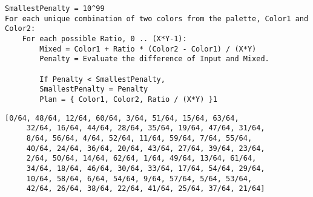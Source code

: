 \begin{lstlisting}[style=pseudocode,caption={План нахождения цвета пикселя}]
SmallestPenalty = 10^99 
For each unique combination of two colors from the palette, Color1 and Color2:
    For each possible Ratio, 0 .. (X*Y-1):
        Mixed = Color1 + Ratio * (Color2 - Color1) / (X*Y)
        Penalty = Evaluate the difference of Input and Mixed.

        If Penalty < SmallestPenalty,
        SmallestPenalty = Penalty
        Plan = { Color1, Color2, Ratio / (X*Y) }1
\end{lstlisting}
\begin{lstlisting}[style=pseudocode,caption={Вспомогательная матрица перого Алгоритма Юлиомы}]
     [0/64, 48/64, 12/64, 60/64, 3/64, 51/64, 15/64, 63/64,
     32/64, 16/64, 44/64, 28/64, 35/64, 19/64, 47/64, 31/64,
     8/64, 56/64, 4/64, 52/64, 11/64, 59/64, 7/64, 55/64,
     40/64, 24/64, 36/64, 20/64, 43/64, 27/64, 39/64, 23/64,
     2/64, 50/64, 14/64, 62/64, 1/64, 49/64, 13/64, 61/64,
     34/64, 18/64, 46/64, 30/64, 33/64, 17/64, 54/64, 29/64,
     10/64, 58/64, 6/64, 54/64, 9/64, 57/64, 5/64, 53/64,
     42/64, 26/64, 38/64, 22/64, 41/64, 25/64, 37/64, 21/64]
\end{lstlisting}




